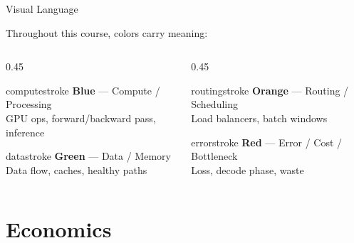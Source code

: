 \documentclass[aspectratio=169, 12pt]{beamer}
\begin{document}
\begin{frame}{Visual Language}

\small
Throughout this course, colors carry meaning:

\vspace{0.3cm}
\begin{columns}[T]
  \begin{column}{0.45\textwidth}
    \begin{mlsyscard}{computestroke}
    \textbf{Blue} --- Compute / Processing\\
    {\footnotesize GPU ops, forward/backward pass, inference}
    \end{mlsyscard}
    \vspace{0.15cm}
    \begin{mlsyscard}{datastroke}
    \textbf{Green} --- Data / Memory\\
    {\footnotesize Data flow, caches, healthy paths}
    \end{mlsyscard}
  \end{column}
  \begin{column}{0.45\textwidth}
    \begin{mlsyscard}{routingstroke}
    \textbf{Orange} --- Routing / Scheduling\\
    {\footnotesize Load balancers, batch windows}
    \end{mlsyscard}
    \vspace{0.15cm}
    \begin{mlsyscard}{errorstroke}
    \textbf{Red} --- Error / Cost / Bottleneck\\
    {\footnotesize Loss, decode phase, waste}
    \end{mlsyscard}
  \end{column}
\end{columns}
\end{frame}



\section{Economics}
\end{document}
